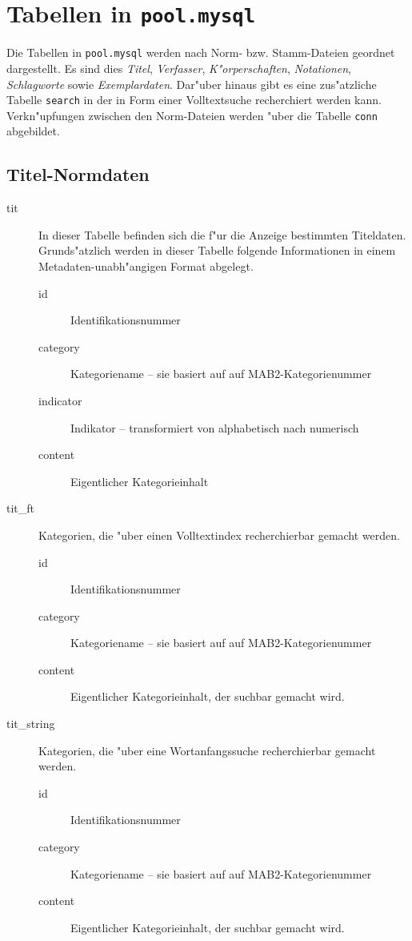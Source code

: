 \documentclass[11pt, twoside, a4paper, BCOR8mm, DIV12, bibtotoc,idxtotoc]{scrbook}
\begin{document}
\begin{itemize}
\begin{description}
\end{description}



\chapter{Tabellen in \texttt{pool.mysql}}

Die Tabellen in \texttt{pool.mysql} werden nach Norm- bzw.
Stamm-Dateien geordnet dargestellt. Es sind dies \emph{Titel},
\emph{Verfasser}, \emph{K"orperschaften}, \emph{Notationen},
\emph{Schlagworte} sowie \emph{Exemplardaten}. Dar"uber hinaus gibt es eine zus"atzliche
Tabelle \texttt{search} in der in Form einer Volltextsuche
recherchiert werden kann. Verkn"upfungen zwischen den Norm-Dateien
werden "uber die Tabelle \texttt{conn} abgebildet.

\section{Titel-Normdaten}

\begin{description}
\item[tit] In dieser Tabelle befinden sich die f"ur die Anzeige
  bestimmten Titeldaten. Grunds"atzlich werden in dieser Tabelle
  folgende Informationen in einem Metadaten-unabh"angigen Format
  abgelegt.
  \begin{description}
  \item[id] Identifikationsnummer
  \item[category] Kategoriename -- sie basiert auf auf MAB2-Kategorienummer
  \item[indicator] Indikator -- transformiert von alphabetisch nach numerisch
  \item[content] Eigentlicher Kategorieinhalt
  \end{description}
\item[tit\_ft] Kategorien, die "uber einen Volltextindex recherchierbar
  gemacht werden.
  \begin{description}
  \item[id] Identifikationsnummer
  \item[category] Kategoriename -- sie basiert auf auf MAB2-Kategorienummer
  \item[content] Eigentlicher Kategorieinhalt, der suchbar gemacht wird.
  \end{description}
\item[tit\_string] Kategorien, die "uber eine Wortanfangssuche
  recherchierbar gemacht werden.
  \begin{description}
  \item[id] Identifikationsnummer
  \item[category] Kategoriename -- sie basiert auf auf MAB2-Kategorienummer
  \item[content] Eigentlicher Kategorieinhalt, der suchbar gemacht wird.
  \end{description}
\end{description}


\end{itemize}
\end{document}
